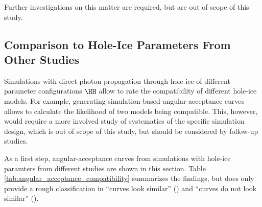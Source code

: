Further investigations on this matter are required, but are out of scope of this study.\followup


\subsection{Comparison to Hole-Ice Parameters From Other Studies}
\label{sec:angular_acceptance_comparison}\label{sec:parameter_comparison}


\newcommand\ok{\ding{51}} %
\newcommand\same{\cellcolor{black!25}}
\newcommand\greyedout{\cellcolor{black!25}}
\newcommand\bad{\ding{55}}

Simulations with direct photon propagation through hole ice of different parameter configurations $\HH$ allow to rate the compatibility of different hole-ice models. For example, generating simulation-based angular-acceptance curves allows to calculate the likelihood of two models being compatible. This, however, would require a more involved study of systematics of the specific simulation design, which is out of scope of this study, but should be considered by follow-up studies.\followup

As a first step, angular-acceptance curves from simulations with hole-ice paramters from different studies are shown in this section. Table \ref{tab:angular_acceptance_compatibility} summarizes the findings, but does only provide a rough classification in \enquote{curves look similar} (\ok) and \enquote{curves do not look similar} (\bad).


